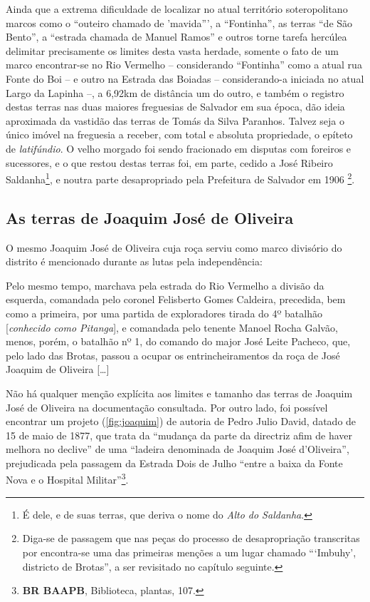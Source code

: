 Ainda que a extrema dificuldade de localizar no atual território soteropolitano marcos como o ``outeiro chamado de 'mavida''', a ``Fontinha'', as terras ``de São Bento'', a ``estrada chamada de Manuel Ramos'' e outros torne tarefa hercúlea delimitar precisamente os limites desta vasta herdade, somente o fato de um marco encontrar-se no Rio Vermelho -- considerando ``Fontinha'' como a atual rua Fonte do Boi -- e outro na Estrada das Boiadas -- considerando-a iniciada no atual Largo da Lapinha --, a 6,92km de distância um do outro, e também o registro destas terras nas duas maiores freguesias de Salvador em sua época, dão ideia aproximada da vastidão das terras de Tomás da Silva Paranhos. Talvez seja o único imóvel na freguesia a receber, com total e absoluta propriedade, o epíteto de \textit{latifúndio}. O velho morgado foi sendo fracionado em disputas com foreiros e sucessores, e o que restou destas terras foi, em parte, cedido a José Ribeiro Saldanha\footnote{É dele, e de suas terras, que deriva o nome do \textit{Alto do Saldanha}.}, e noutra parte desapropriado pela Prefeitura de Salvador em 1906 \cite[p.~III-13 - III-14]{teixeira_doacoes_1978}\footnote{Diga-se de passagem que nas peças do processo de desapropriação transcritas por  encontra-se uma das primeiras menções a um lugar chamado ```Imbuhy', districto de Brotas'', a ser revisitado no capítulo seguinte.}.

\subsection{As terras de Joaquim José de Oliveira}

O mesmo Joaquim José de Oliveira cuja roça serviu como marco divisório do distrito é mencionado durante as lutas pela independência:

\begin{citacao}
Pelo mesmo tempo, marchava pela estrada do Rio Vermelho a divisão da esquerda, comandada pelo coronel Felisberto Gomes Caldeira, precedida, bem como a primeira, por uma partida de exploradores tirada do 4º batalhão [\textit{conhecido como Pitanga}], e comandada pelo tenente Manoel Rocha Galvão, menos, porém, o batalhão nº 1, do comando do major José Leite Pacheco, que, pelo lado das Brotas, passou a ocupar os entrincheiramentos da roça de José Joaquim de Oliveira [\dots] \cite[p.~58]{vieira_memorias_1903}
\end{citacao}

Não há qualquer menção explícita aos limites e tamanho das terras de Joaquim José de Oliveira na documentação consultada. Por outro lado, foi possível encontrar um projeto (\autoref{fig:joaquim}) de autoria de Pedro Julio David, datado de 15 de maio de 1877, que trata da ``mudança da parte da directriz afim de haver melhora no declive'' de uma ``ladeira denominada de Joaquim José d'Oliveira'', prejudicada pela passagem da Estrada Dois de Julho ``entre a baixa da Fonte Nova e o Hospital Militar''\footnote{\textbf{BR BAAPB}, Biblioteca, plantas, 107.}. 

